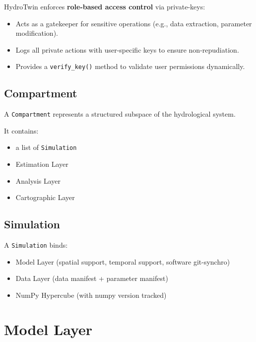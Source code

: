 HydroTwin enforces \textbf{role-based access control} via private-keys:
\begin{itemize}
    \item Acts as a gatekeeper for sensitive operations (e.g., data extraction, parameter modification).
    \item Logs all private actions with user-specific keys to ensure non-repudiation.
    \item Provides a \texttt{verify\_key()} method to validate user permissions dynamically.
\end{itemize}







\subsection{Compartment}

A \texttt{Compartment} represents a structured subspace of the hydrological system.

It contains:

\begin{itemize}
\item a list of \texttt{Simulation}
\item Estimation Layer
\item Analysis Layer
\item Cartographic Layer
\end{itemize}

\subsection{Simulation}

A \texttt{Simulation} binds:

\begin{itemize}
\item Model Layer (spatial support, temporal support, software git-synchro)
\item Data Layer (data manifest + parameter manifest)
\item NumPy Hypercube (with numpy version tracked)
\end{itemize}


\section{Model Layer}
\label{ch:model-layer}

